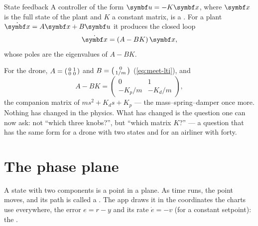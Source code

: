 \begin{definition}{State feedback}
A controller of the form $\symbf u = -K\vx$, where $\vx$ is the full state of the plant and $K$ a constant matrix, is a . For a plant $\dot{\vx} = A\vx + B\symbf u$ it produces the closed loop
\begin{equation}\label{eq:state-cl}
  \dot{\vx} = (A - BK)\,\vx ,
\end{equation}
whose poles are the eigenvalues of $A - BK$.
\end{definition}

For the drone, $A = \begin{psmallmatrix}0 & 1\\ 0 & 0\end{psmallmatrix}$ and $B = \begin{psmallmatrix}0\\ 1/m\end{psmallmatrix}$ (\cref{eq:meet-lti}), and
\begin{equation}\label{eq:state-acl}
  A - BK = \begin{pmatrix} 0 & 1\\ -K_p/m & -K_d/m\end{pmatrix} ,
\end{equation}
the companion matrix of $m s^2 + K_d s + K_p$ — the mass–spring–damper once more. Nothing has changed in the physics. What has changed is the question one can now ask: not \enquote{which three knobs?}, but \enquote{which matrix $K$?} — a question that has the same form for a drone with two states and for an airliner with forty.

\section{The phase plane}

A state with two components is a point in a plane. As time runs, the point moves, and its path is called a . The app draws it in the coordinates the charts use everywhere, the error $e = r - y$ and its rate $\dot e = -v$ (for a constant setpoint): the .

